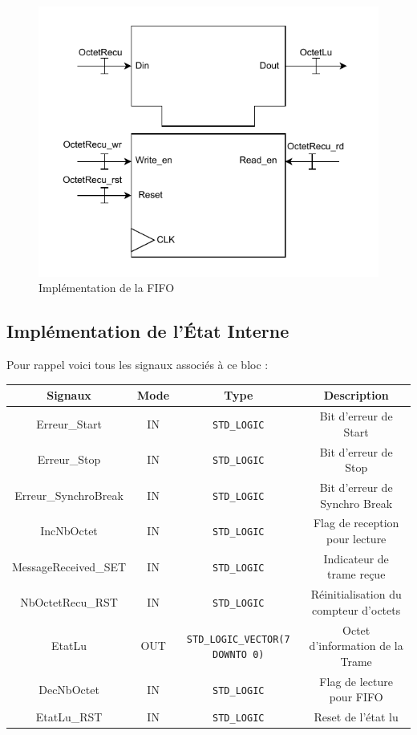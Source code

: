 \begin{figure}[H]
    \centering
    \includegraphics[width=0.8\linewidth]{images/inter/Implementation_FIFO.pdf}
    \caption{Implémentation de la FIFO}
    \label{fig:placeholder}
\end{figure}

\subsection{Implémentation de l’État Interne}

Pour rappel voici tous les signaux associés à ce bloc : 
\newline

\begin{center}
    \begin{tabular}{| c || c | c | c |}
     \hline			
       \textbf{Signaux} & \textbf{Mode} & \textbf{Type} & \textbf{Description}  \\ \hline 
       Erreur\_Start & IN & \texttt{STD\_LOGIC} & Bit d’erreur de Start \\
       Erreur\_Stop & IN & \texttt{STD\_LOGIC} & Bit d’erreur de Stop\\
       Erreur\_SynchroBreak & IN & \texttt{STD\_LOGIC} & Bit d’erreur de Synchro Break\\
       IncNbOctet & IN & \texttt{STD\_LOGIC} & Flag de reception pour lecture \\
       MessageReceived\_SET & IN & \texttt{STD\_LOGIC} & Indicateur de trame reçue \\
       NbOctetRecu\_RST & IN & \texttt{STD\_LOGIC} & Réinitialisation du compteur d’octets \\
       EtatLu & OUT & \texttt{STD\_LOGIC\_VECTOR(7 DOWNTO 0)} & Octet d'information de la Trame \\
       DecNbOctet & IN & \texttt{STD\_LOGIC} & Flag de lecture pour FIFO \\
       EtatLu\_RST & IN & \texttt{STD\_LOGIC} & Reset de l'état lu \\
     \hline  
    \end{tabular}
\end{center}

